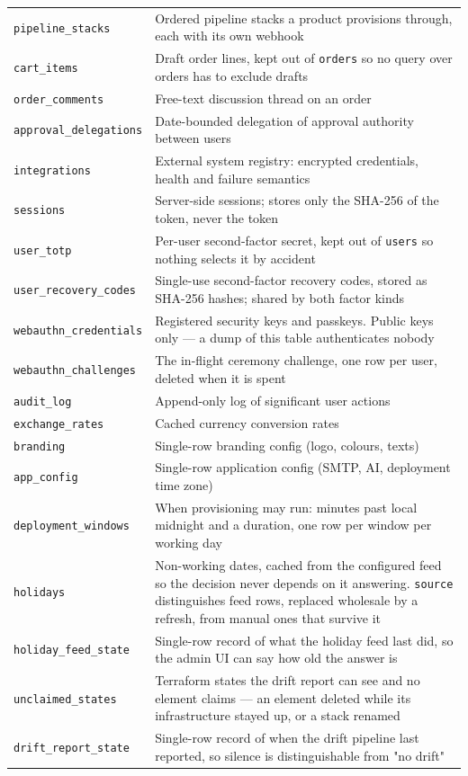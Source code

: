 \documentclass[12pt,a4paper,twoside]{report}
\newcommand{\code}[1]{\texttt{#1}}
\begin{document}
\begin{table}[H]
\begin{tabular}{@{}lp{9cm}@{}}
    \code{pipeline\_stacks}         & Ordered pipeline stacks a product provisions through, each with its own webhook \\
    \code{cart\_items}              & Draft order lines, kept out of \code{orders} so no query over orders has to exclude drafts \\
    \code{order\_comments}          & Free-text discussion thread on an order \\
    \code{approval\_delegations}    & Date-bounded delegation of approval authority between users \\
    \code{integrations}             & External system registry: encrypted credentials, health and failure semantics \\
    \code{sessions}                 & Server-side sessions; stores only the SHA-256 of the token, never the token \\
    \code{user\_totp}               & Per-user second-factor secret, kept out of \code{users} so nothing selects it by accident \\
    \code{user\_recovery\_codes}    & Single-use second-factor recovery codes, stored as SHA-256 hashes; shared by both factor kinds \\
    \code{webauthn\_credentials}    & Registered security keys and passkeys. Public keys only — a dump of this table authenticates nobody \\
    \code{webauthn\_challenges}     & The in-flight ceremony challenge, one row per user, deleted when it is spent \\
    \code{audit\_log}               & Append-only log of significant user actions \\
    \code{exchange\_rates}          & Cached currency conversion rates \\
    \code{branding}                 & Single-row branding config (logo, colours, texts) \\
    \code{app\_config}              & Single-row application config (SMTP, AI, deployment time zone) \\
    \code{deployment\_windows}      & When provisioning may run: minutes past local midnight and a duration, one row per window per working day \\
    \code{holidays}                 & Non-working dates, cached from the configured feed so the decision never depends on it answering. \code{source} distinguishes feed rows, replaced wholesale by a refresh, from manual ones that survive it \\
    \code{holiday\_feed\_state}     & Single-row record of what the holiday feed last did, so the admin UI can say how old the answer is \\
    \code{unclaimed\_states}        & Terraform states the drift report can see and no element claims — an element deleted while its infrastructure stayed up, or a stack renamed \\
    \code{drift\_report\_state}     & Single-row record of when the drift pipeline last reported, so silence is distinguishable from "no drift" \\
    \bottomrule
  \end{tabular}
\end{table}
\end{document}
